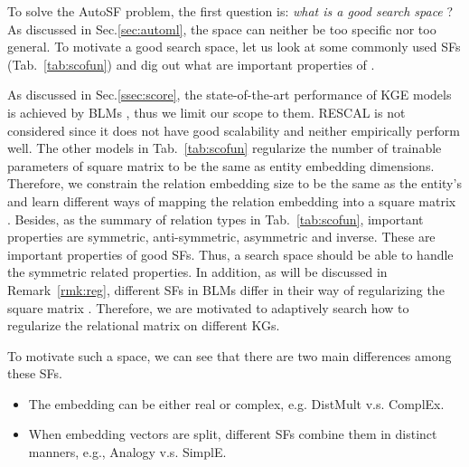 \documentclass[conference]{IEEEtran}
\begin{document}
{
To solve the AutoSF problem,
the first question is:
\textit{what is a good search space }?
As discussed in Sec.\ref{sec:automl},
the space can neither be too specific nor too general.
To motivate a good search space,
let us look at some commonly used SFs (Tab.~\ref{tab:scofun})
and dig out what are important properties of .

As discussed in Sec.\ref{ssec:score},
the state-of-the-art performance of KGE models
is achieved by BLMs \cite{lacroix2018canonical,kazemi2018simple},
thus we limit our scope to them. 
RESCAL \cite{nickel2011three} is not considered 
since it does not have good scalability \cite{liu2017analogical,trouillon2017knowledge}
and neither empirically perform well.
The other models in Tab.~\ref{tab:scofun}
regularize the number of trainable parameters of
square matrix  to be the same as entity embedding dimensions.
Therefore, we constrain the relation embedding size to be the same as the entity's
and learn different ways of mapping the relation embedding 
into a square matrix .
Besides, 
as the summary of relation types in Tab.~\ref{tab:scofun},
important properties are symmetric, anti-symmetric, asymmetric and inverse.
These are important properties of good SFs.
Thus, a search space should be able to handle the symmetric related properties.
In addition,
as will be discussed in Remark~\ref{rmk:reg},
different SFs in BLMs differ in their way of regularizing the square matrix .
Therefore, we are motivated to adaptively search how to regularize the relational matrix on different KGs.

To motivate such a space,
we can see that there are two main differences among these SFs.
\begin{itemize}[leftmargin=15px]
\item
The embedding can be either real or complex,
e.g. DistMult v.s. ComplEx.

\item
When embedding vectors are split,
different SFs combine them in distinct manners,
e.g., Analogy v.s. SimplE.
\end{itemize}


}
\end{document}
